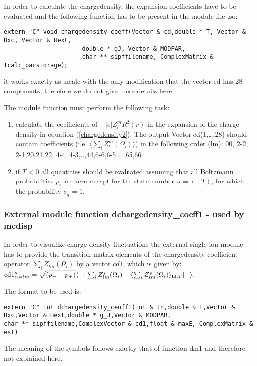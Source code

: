 In order to calculate the chargedensity, the expansion coefficients
have to be evaluated and
 the following function has to be present in the module file {\prg *.so}:

\begin{verbatim}
extern "C" void chargedensity_coeff(Vector & cd,double * T, Vector & Hxc, Vector & Hext,
                      double * gJ, Vector & MODPAR,
                      char ** sipffilename, ComplexMatrix & Icalc_parstorage);
\end{verbatim}

it works exactly as {\prg mcalc} with the only modification
that the vector cd has 28 components, therefore we do not give more details here.

The module function must perform the following task:
\begin{enumerate}
\item calculate the coefficients of $-|e|Z_l^m R^2(r)$ in the expansion of
      the charge density in equation (\ref{chargedensity2}).
      The output Vector cd(1,\dots,28) should contain  coefficients 
     (i.e. $\langle\sum_i Z_l^m (\Omega_i)\rangle$)
      in the following order (lm):  00, 2-2, 2-1,20,21,22, 4-4, 4-3,..,44,6-6,6-5 ...,65,66
\item if $T<0$ all quantities should be evaluated assuming that all Boltzmann probabilities $p_i$
 are zero except for the state number $n=(-T)$, for which the probability $p_n=1$.
\end{enumerate}


\subsubsection{External module function {\prg dchargedensity\_coeff1} - used by {\prg mcdisp}}

In order to visualize charge density  fluctuations 
 the external single ion module has to provide the transition
matrix elements of the chargedensity coefficient operator $\sum_i Z_{lm}(\Omega_i)$ by a
vector $cd1$, which is given by:
 ${\rm cd1}^s_{\alpha=lm}=\sqrt{(p_--p_+)}\langle -|\sum_i Z^s_{lm}(\Omega_i)-\langle \sum_i Z^s_{lm}(\Omega_i)\rangle_{\mathbf H,T}|+\rangle$. 

The format to be used is:
{\footnotesize
\begin{verbatim}
extern "C" int dchargedensity_ceoff1(int & tn,double & T,Vector & Hxc,Vector & Hext,double * g_J,Vector & MODPAR,
char ** sipffilename,ComplexVector & cd1,float & maxE, ComplexMatrix & est)
\end{verbatim}
}
The meaning of the symbols follows exactly that of function 
{\prg dm1} and therefore not explained here.


